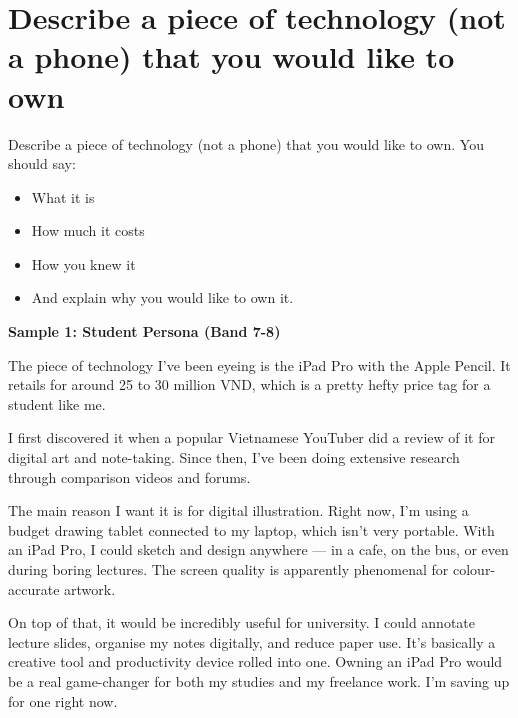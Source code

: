 \newpage

\section{Describe a piece of technology (not a phone) that you would like to own}
\begin{ieltsprompt}
Describe a piece of technology (not a phone) that you would like to own.
You should say:
\begin{itemize}[leftmargin=2em, itemsep=2pt]
\item What it is
\item How much it costs
\item How you knew it
\item And explain why you would like to own it.
\end{itemize}
\end{ieltsprompt}
\begin{ieltsanswer}
\textbf{Sample 1: Student Persona (Band 7-8)}

The piece of technology I've been eyeing is the iPad Pro with the Apple Pencil. It retails for around 25 to 30 million VND, which is a pretty hefty price tag for a student like me.

I first discovered it when a popular Vietnamese YouTuber did a review of it for digital art and note-taking. Since then, I've been doing extensive research through comparison videos and forums.

The main reason I want it is for digital illustration. Right now, I'm using a budget drawing tablet connected to my laptop, which isn't very portable. With an iPad Pro, I could sketch and design anywhere — in a cafe, on the bus, or even during boring lectures. The screen quality is apparently phenomenal for colour-accurate artwork.

On top of that, it would be incredibly useful for university. I could annotate lecture slides, organise my notes digitally, and reduce paper use. It's basically a creative tool and productivity device rolled into one. Owning an iPad Pro would be a real game-changer for both my studies and my freelance work. I'm saving up for one right now.
\end{ieltsanswer}


